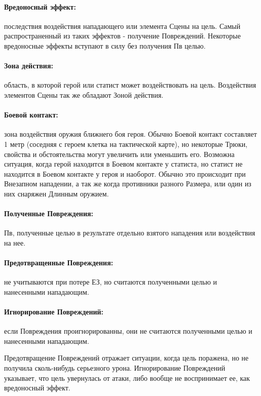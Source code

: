 \paragraph{Вредоносный эффект:} последствия воздействия нападающего или элемента Сцены на цель. Самый распространенный из таких эффектов - получение Повреждений. Некоторые вредоносные эффекты вступают в силу без получения Пв целью.
\paragraph{Зона действия:} область, в которой герой или статист может воздействовать на цель. Воздействия элементов Сцены так же обладают Зоной действия.
\paragraph{Боевой контакт:} зона воздействия оружия ближнего боя героя. Обычно Боевой контакт составляет 1 метр (соседняя с героем клетка на тактической карте), но некоторые Трюки, свойства и обстоятельства могут увеличить или уменьшить его.
\newline Возможна ситуация, когда герой находится в Боевом контакте у статиста, но статист не находится в Боевом контакте у героя и наоборот. Обычно это происходит при Внезапном нападении, а так же когда противники разного Размера, или один из них снаряжен Длинным оружием.
\paragraph{Полученные Повреждения:} Пв, полученные целью в результате отдельно взятого нападения или воздействия на нее. 
\paragraph{Предотвращенные Повреждения:} не учитываются при потере ЕЗ, но считаются полученными целью и нанесенными нападающим.
\paragraph{Игнорирование Повреждений:} если Повреждения проигнорированны, они не считаются полученными целью и нанесенными нападающим.
\begin{tcolorbox}
  Предотвращение Повреждений отражает ситуации, когда цель поражена, но не получила сколь-нибудь серьезного урона. Игнорирование Повреждений указывает, что цель увернулась от атаки, либо вообще не воспринимает ее, как вредоносный эффект.
\end{tcolorbox}

